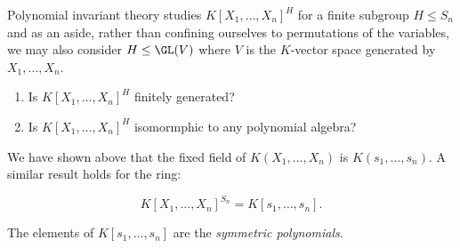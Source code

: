 \documentclass[a4paper]{article}
\begin{document}
Polynomial invariant theory studies \(K[X_1, \dots, X_n]^H\) for a finite subgroup \(H \leq S_n\) and as an aside, rather than confining ourselves to permutations of the variables, we may also consider \(H \leq \GL(V)\) where \(V\) is the \(K\)-vector space generated by \(X_1, \dots, X_n\).

\begin{question}\leavevmode
  \begin{enumerate}
  \item Is \(K[X_1, \dots, X_n]^H\) finitely generated?
  \item Is \(K[X_1, \dots, X_n]^H\) isomormphic to any polynomial algebra?
  \end{enumerate}
\end{question}

We have shown above that the fixed field of \(K(X_1, \dots, X_n)\) is \(K(s_1, \dots, s_n)\). A similar result holds for the ring:

\begin{theorem}
  \[
    K[X_1, \dots, X_n]^{S_n} = K[s_1, \dots, s_n].
  \]
\end{theorem}

\begin{definition}
  The elements of \(K[s_1, \dots, s_n]\) are the \emph{symmetric polynomials}.
\end{definition}
\end{document}

